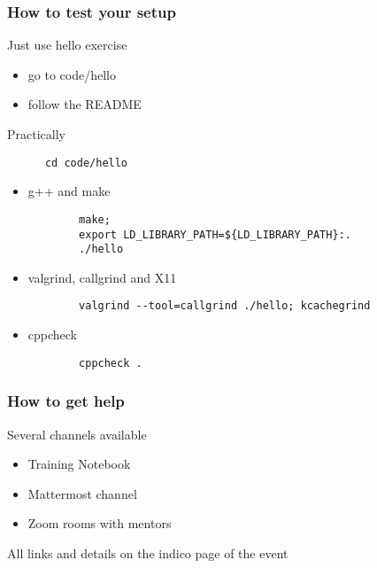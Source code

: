 \documentclass[compress]{beamer}
\begin{document}
\begin{frame}[fragile]
  \frametitle{How to test your setup}
  \begin{exampleblock}{Just use hello exercise}
    \begin{itemize}
    \item go to code/hello
    \item follow the README
    \end{itemize}
  \end{exampleblock}
  \begin{block}{Practically}
    \begin{verbatim}
      cd code/hello
    \end{verbatim}
    \begin{itemize}
    \item g++ and make
      \begin{verbatim}
        make;
        export LD_LIBRARY_PATH=${LD_LIBRARY_PATH}:.
        ./hello
      \end{verbatim}
    \item valgrind, callgrind and X11
      \begin{verbatim}
        valgrind --tool=callgrind ./hello; kcachegrind
      \end{verbatim}
    \item cppcheck
      \begin{verbatim}
        cppcheck .
      \end{verbatim}
    \end{itemize}
  \end{block}
\end{frame}

\begin{frame}
  \frametitle{How to get help}
  \Large Several channels available
  \begin{itemize}
  \item Training Notebook
  \item Mattermost channel
  \item Zoom rooms with mentors
  \end{itemize}
  All links and details on the indico page of the event
\end{frame}
\end{document}
